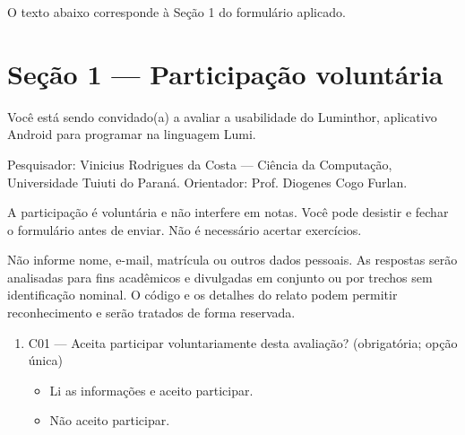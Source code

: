 
O texto abaixo corresponde à Seção 1 do formulário aplicado.

\section*{Seção 1 --- Participação voluntária}

Você está sendo convidado(a) a avaliar a usabilidade do Luminthor, aplicativo Android
para programar na linguagem Lumi.

Pesquisador: Vinicius Rodrigues da Costa --- Ciência da Computação, Universidade
Tuiuti do Paraná. Orientador: Prof. Diogenes Cogo Furlan.

A participação é voluntária e não interfere em notas. Você pode desistir e fechar o
formulário antes de enviar. Não é necessário acertar exercícios.

Não informe nome, e-mail, matrícula ou outros dados pessoais. As respostas serão
analisadas para fins acadêmicos e divulgadas em conjunto ou por trechos sem
identificação nominal. O código e os detalhes do relato podem permitir reconhecimento
e serão tratados de forma reservada.

\begin{enumerate}
\item C01 --- Aceita participar voluntariamente desta avaliação? (obrigatória; opção
  única)
  \begin{itemize}
    \item Li as informações e aceito participar.
    \item Não aceito participar.
  \end{itemize}
\end{enumerate}
